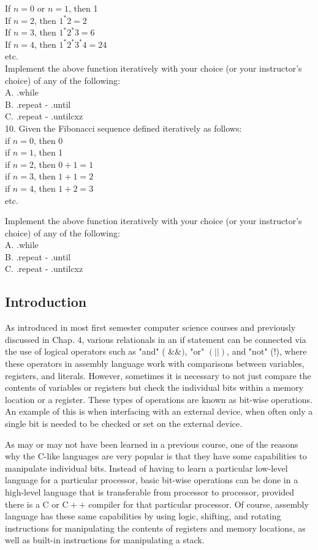 \documentclass[10pt]{book}
\begin{document}
If $n=0$ or $n=1$, then 1\\
If $n=2$, then $1^{*} 2=2$\\
If $n=3$, then $1^{*} 2^{*} 3=6$\\
If $n=4$, then $1^{*} 2^{*} 3^{*} 4=24$\\
etc.\\
Implement the above function iteratively with your choice (or your instructor's choice) of any of the following:\\
A. .while\\
B. .repeat - .until\\
C. .repeat - .untilcxz\\
10. Given the Fibonacci sequence defined iteratively as follows:\\
if $n=0$, then 0\\
if $n=1$, then 1\\
if $n=2$, then $0+1=1$\\
if $n=3$, then $1+1=2$\\
if $n=4$, then $1+2=3$\\
etc.

Implement the above function iteratively with your choice (or your instructor's choice) of any of the following:\\
A. .while\\
B. .repeat - .until\\
C. .repeat - .untilcxz

\subsection{Introduction}
As introduced in most first semester computer science courses and previously discussed in Chap. 4, various relationals in an if statement can be connected via the use of logical operators such as "and" ( $\& \&)$, "or" $(|\mid)$, and "not" (!), where these operators in assembly language work with comparisons between variables, registers, and literals. However, sometimes it is necessary to not just compare the contents of variables or registers but check the individual bits within a memory location or a register. These types of operations are known as bit-wise operations. An example of this is when interfacing with an external device, when often only a single bit is needed to be checked or set on the external device.

As may or may not have been learned in a previous course, one of the reasons why the C-like languages are very popular is that they have some capabilities to manipulate individual bits. Instead of having to learn a particular low-level language for a particular processor, basic bit-wise operations can be done in a high-level language that is transferable from processor to processor, provided there is a C or $\mathrm{C}++$ compiler for that particular processor. Of course, assembly language has these same capabilities by using logic, shifting, and rotating instructions for manipulating the contents of registers and memory locations, as well as built-in instructions for manipulating a stack.
\end{document}
